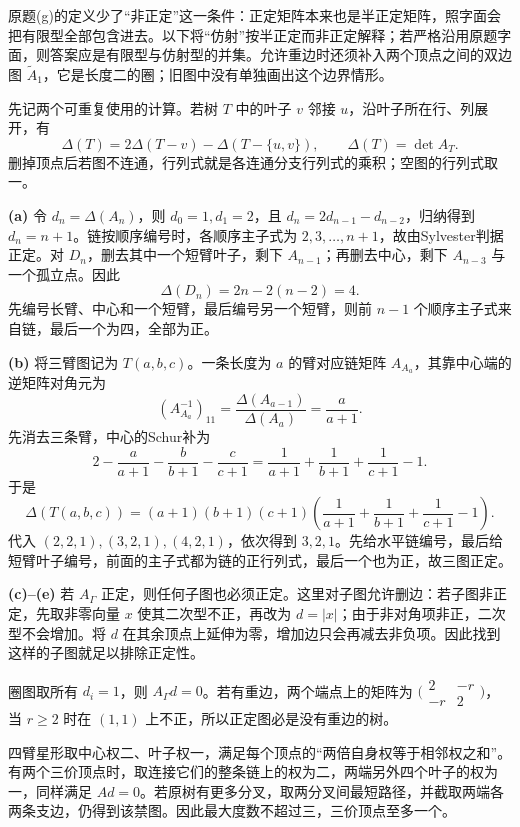 \begin{remark}
原题(g)的定义少了“非正定”这一条件：正定矩阵本来也是半正定矩阵，照字面会把有限型全部包含进去。以下将“仿射”按半正定而非正定解释；若严格沿用原题字面，则答案应是有限型与仿射型的并集。允许重边时还须补入两个顶点之间的双边图 $\widetilde A_1$，它是长度二的圈；旧图中没有单独画出这个边界情形。
\end{remark}
\begin{solution}
先记两个可重复使用的计算。若树 $T$ 中的叶子 $v$ 邻接 $u$，沿叶子所在行、列展开，有
\[
 \Delta(T)=2\Delta(T-v)-\Delta(T-\{u,v\}),\qquad
 \Delta(T)=\det A_T.
\]
删掉顶点后若图不连通，行列式就是各连通分支行列式的乘积；空图的行列式取一。

\textbf{(a)} 令 $d_n=\Delta(A_n)$，则 $d_0=1,d_1=2$，且 $d_n=2d_{n-1}-d_{n-2}$，归纳得到 $d_n=n+1$。链按顺序编号时，各顺序主子式为 $2,3,\ldots,n+1$，故由Sylvester判据正定。对 $D_n$，删去其中一个短臂叶子，剩下 $A_{n-1}$；再删去中心，剩下 $A_{n-3}$ 与一个孤立点。因此
\[
 \Delta(D_n)=2n-2(n-2)=4.
\]
先编号长臂、中心和一个短臂，最后编号另一个短臂，则前 $n-1$ 个顺序主子式来自链，最后一个为四，全部为正。

\textbf{(b)} 将三臂图记为 $T(a,b,c)$。一条长度为 $a$ 的臂对应链矩阵 $A_{A_a}$，其靠中心端的逆矩阵对角元为
\[
 (A_{A_a}^{-1})_{11}=\frac{\Delta(A_{a-1})}{\Delta(A_a)}=\frac a{a+1}.
\]
先消去三条臂，中心的Schur补为
\[
 2-\frac a{a+1}-\frac b{b+1}-\frac c{c+1}
 =\frac1{a+1}+\frac1{b+1}+\frac1{c+1}-1.
\]
于是
\[
 \Delta(T(a,b,c))=(a+1)(b+1)(c+1)
 \left(\frac1{a+1}+\frac1{b+1}+\frac1{c+1}-1\right).
\]
代入 $(2,2,1),(3,2,1),(4,2,1)$，依次得到 $3,2,1$。先给水平链编号，最后给短臂叶子编号，前面的主子式都为链的正行列式，最后一个也为正，故三图正定。

\textbf{(c)--(e)} 若 $A_\Gamma$ 正定，则任何子图也必须正定。这里对子图允许删边：若子图非正定，先取非零向量 $x$ 使其二次型不正，再改为 $d=|x|$；由于非对角项非正，二次型不会增加。将 $d$ 在其余顶点上延伸为零，增加边只会再减去非负项。因此找到这样的子图就足以排除正定性。

圈图取所有 $d_i=1$，则 $A_\Gamma d=0$。若有重边，两个端点上的矩阵为 $\bigl(\begin{smallmatrix}2&-r\\-r&2\end{smallmatrix}\bigr)$，当 $r\ge2$ 时在 $(1,1)$ 上不正，所以正定图必是没有重边的树。

四臂星形取中心权二、叶子权一，满足每个顶点的“两倍自身权等于相邻权之和”。有两个三价顶点时，取连接它们的整条链上的权为二，两端另外四个叶子的权为一，同样满足 $Ad=0$。若原树有更多分叉，取两分叉间最短路径，并截取两端各两条支边，仍得到该禁图。因此最大度数不超过三，三价顶点至多一个。


\end{solution}
